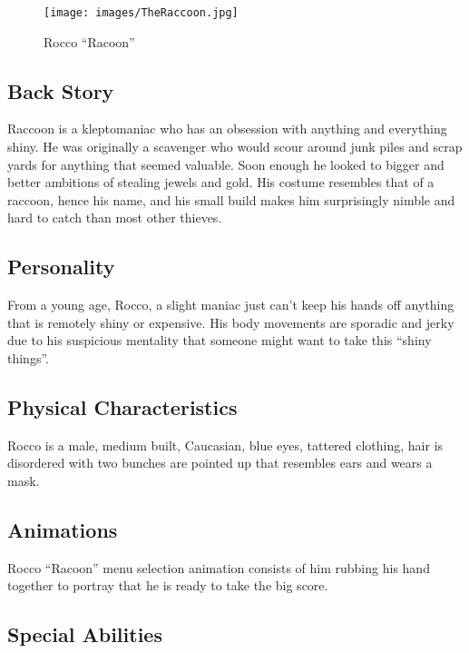 \documentclass[10pt]{report}
\begin{document}
\begin{multicols}{2}    
    \begin{figure}[H]
        \centering
        \texttt{[image: images/TheRaccoon.jpg]}
        \caption{Rocco ``Racoon''}
    \end{figure}
    
    \subsection{Back Story}
    
    Raccoon is a kleptomaniac who has an obsession with anything and everything shiny. He was originally a scavenger who would scour around junk piles and scrap yards for anything that seemed valuable. Soon enough he looked to bigger and better ambitions of stealing jewels and gold. His costume resembles that of a raccoon, hence his name, and his small build makes him surprisingly nimble and hard to catch than most other thieves.
    \subsection{Personality}
    
    From a young age, Rocco, a slight maniac just can’t keep his hands off anything that is remotely shiny or expensive. His body movements are sporadic and jerky due to his suspicious mentality that someone might want to take this ``shiny things''.
    
    \subsection{Physical Characteristics}
    
    Rocco is a male, medium built, Caucasian, blue eyes, tattered clothing, hair is disordered with two bunches are pointed up that resembles ears and wears a mask.
    
    \subsection{Animations}
    
    Rocco ``Racoon'' menu selection animation consists of him rubbing his hand together to portray that he is ready to take the big score.
    
    \subsection{Special Abilities}
    

\end{multicols}
\end{document}
